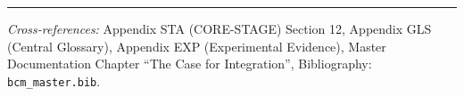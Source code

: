 
\vspace{1em}
\hrule
\vspace{0.5em}

\noindent\textit{Cross-references:}
Appendix STA (CORE-STAGE) Section 12,
Appendix GLS (Central Glossary),
Appendix EXP (Experimental Evidence),
Master Documentation Chapter ``The Case for Integration'',
Bibliography: \texttt{bcm\_master.bib}.


